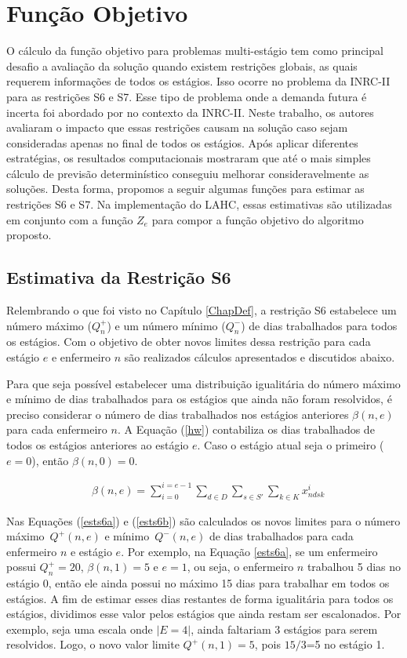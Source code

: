\documentclass[cic,tc, twoside]{iiufrgs}
\begin{document}
\section{Função Objetivo}\label{SecCalcSemanal}

O cálculo da função objetivo para problemas multi-estágio tem como principal desafio a avaliação da solução quando existem restrições globais, as quais requerem informações de todos os estágios. Isso ocorre no problema da INRC-II para as restrições S6 e S7.
Esse tipo de problema onde a demanda futura é incerta foi abordado por \citet{romer2016future} no contexto da INRC-II. Neste trabalho, os autores avaliaram o impacto que essas restrições causam na solução caso sejam consideradas apenas no final de todos os estágios. Após aplicar diferentes estratégias, os resultados computacionais mostraram que até o mais simples cálculo de previsão determinístico conseguiu melhorar consideravelmente as soluções. 
Desta forma, propomos a seguir algumas funções para estimar as restrições S6 e S7. Na implementação do LAHC, essas estimativas são utilizadas em conjunto com a função $Z_e$ para compor a função objetivo do algoritmo proposto.

\subsection{Estimativa da Restrição S6}\label{subs6}

Relembrando o que foi visto no Capítulo \ref{ChapDef}, a restrição S6 estabelece um número máximo ($Q^+_{n}$) e um número mínimo ($Q^-_{n}$) de dias trabalhados para todos os estágios. Com o objetivo de obter novos limites dessa restrição para cada estágio $e$ e enfermeiro $n$ são realizados cálculos apresentados e discutidos abaixo.

Para que seja possível estabelecer uma distribuição igualitária do número máximo e mínimo de dias trabalhados para os estágios que ainda não foram resolvidos, é preciso considerar o número de dias trabalhados nos estágios anteriores $\beta(n,e)$ para cada enfermeiro $n$. A Equação (\ref{hw}) contabiliza os dias trabalhados de todos os estágios anteriores ao estágio $e$. Caso o estágio atual seja o primeiro ($e=0$), então $\beta(n,0)=0$.  

\begin{align}
& \beta(n,e) = \sum_{i=0}^{i=e-1}\sum_{d \in D} \sum_{s \in S'}\sum_{k \in K} x^i_{ndsk}   \label{hw} 
\end{align}

Nas Equações (\ref{ests6a}) e (\ref{ests6b}) são calculados os novos limites para o número máximo~$Q^{+}(n,e)$ e mínimo~$Q^{-}(n,e)$ de dias trabalhados para cada enfermeiro $n$ e estágio $e$.
Por exemplo, na Equação \ref{ests6a}, se um enfermeiro possui $Q^{+}_n=20$, $\beta(n,1)=5$ e $e=1$, ou seja, o enfermeiro $n$ trabalhou 5 dias no estágio 0, então ele ainda possui no máximo 15 dias para trabalhar em todos os estágios. A fim de estimar esses dias restantes de forma igualitária para todos os estágios, dividimos esse valor pelos estágios que ainda restam ser escalonados.
Por exemplo, seja uma escala onde $|E=4|$, ainda faltariam 3 estágios para serem resolvidos. Logo, o novo valor limite $Q^{+}(n,1)=5$, pois $15/3$=5 no estágio 1.
\end{document}
